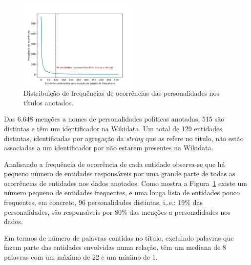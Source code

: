 \documentclass[a4paper, twocolumn, 11pt, twoside]{article}
\begin{document}


\begin{figure}
  \centering
    \includegraphics[width=0.53\textwidth]{power_law_ent_freq.png}
  \caption{Distribuição de frequências de ocorrências das personalidades nos títulos anotados.}
  \label{fig:ent_power_law}
\end{figure}

Das 6.648 menções a nomes de personalidades políticas anotadas, 515 são distintas e têm um identificador na Wikidata. Um total de 129 entidades distintas, identificadas por agregação da \textit{string} que as refere no título, não estão associadas a um identificador por não estarem presentes na Wikidata. 

Analisando a frequência de ocorrência de cada entidade observa-se que há pequeno número de entidades responsáveis por uma grande parte de todas as ocorrências de entidades nos dados anotados. Como mostra a Figura~\ref{fig:ent_power_law} existe um número pequeno de entidades frequentes, e uma longa lista de entidades pouco frequentes, em concreto, 96 personalidades distintas, i,.e.: 19\% das personalidades, são responsáveis por 80\% das menções a personalidades nos dados.

Em termos de número de palavras contidas no título, excluindo palavras que fazem parte das entidades envolvidas numa relação, têm um mediana de 8 palavras com um máximo de 22 e um mínimo de 1.
\end{document}
